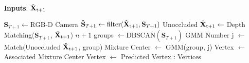 \begin{algorithm}[t]
\caption{State Estimation with Presence of Occlusion} 
\label{code:state estimation}
\textbf{Inputs}: $\hat{\textbf{X}}_\text{t+1}$
\begin{algorithmic}[1]
\State $\textbf{S}_{T+1} \leftarrow \text{RGB-D Camera}$
\State $\tilde{\textbf{S}}_{T+1} \leftarrow \text{filter}(\hat{\textbf{X}}_\text{t+1}, \textbf{S}_{T+1})$
\State Unoccluded $\hat{\textbf{X}}_\text{t+1} \leftarrow $ Depth Matching($\tilde{\textbf{S}}_{T+1}$, $\hat{\textbf{X}}_\text{t+1}$)
\State $n_{\tilde{}}+1$ groups $\leftarrow \text{DBSCAN}(\tilde{\textbf{S}}_{T+1})$
\State GMM Number j $\leftarrow $ Match(Unoccluded $\hat{\textbf{X}}_\text{t+1}$, group)
\State Mixture Center $\leftarrow$ GMM(group,  j)
\EndFor
\State Vertex $\leftarrow$ Associated Mixture Center
\Else
\State Vertex $\leftarrow$ Predicted Vertex
\EndIf{}
\EndFor
\State \Return: Vertices
\end{algorithmic}
\end{algorithm}

